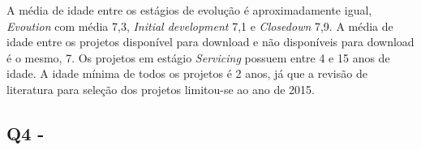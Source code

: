 

A média de idade entre os estágios de evolução é aproximadamente igual, {\it
Evoution} com média 7,3, {\it Initial development} 7,1 e {\it Closedown} 7,9.
A média de idade entre os projetos disponível para download e não disponíveis
para download é o mesmo, 7. Os projetos em estágio {\it Servicing} possuem
entre 4 e 15 anos de idade. A idade mínima de todos os projetos é 2 anos, já
que a revisão de literatura para seleção dos projetos limitou-se ao ano de
2015.

%
%


\subsection{Q4 - \QuestaoQuatro} %


